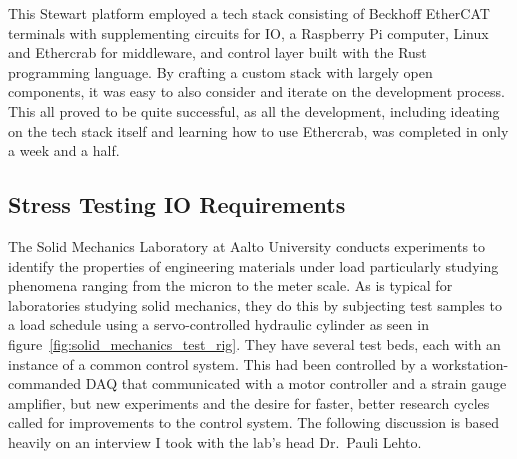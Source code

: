 \documentclass[english,12pt,a4paper,pdftex,eng,utf8]{aaltothesis}
\begin{document}
This Stewart platform employed a tech stack consisting of Beckhoff EtherCAT terminals with supplementing circuits for IO, a Raspberry Pi computer, Linux and Ethercrab for middleware, and control layer built with the Rust programming language.  By crafting a custom stack with largely open components, it was easy to also consider and iterate on the development process.  This all proved to be quite successful, as all the development, including ideating on the tech stack itself and learning how to use Ethercrab, was completed in only a week and a half.

\subsection{Stress Testing IO Requirements}

The Solid Mechanics Laboratory at Aalto University conducts experiments to identify the properties of engineering materials under load particularly studying phenomena ranging from the micron to the meter scale.  As is typical for laboratories studying solid mechanics, they do this by subjecting test samples to a load schedule using a servo-controlled hydraulic cylinder as seen in figure~\ref{fig:solid_mechanics_test_rig}.  They have several test beds, each with an instance of a common control system.  This had been controlled by a workstation-commanded DAQ that communicated with a motor controller and a strain gauge amplifier, but new experiments and the desire for faster, better research cycles called for improvements to the control system.  The following discussion is based heavily on an interview I took with the lab's head Dr.~Pauli Lehto.
\end{document}
